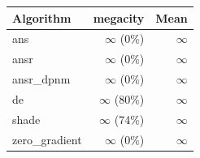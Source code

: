\begin{tabular}{lrr}
\toprule
Algorithm & megacity & Mean \\
\midrule
ans & $\infty$ (0\%) & $\infty$ \\
ansr & $\infty$ (0\%) & $\infty$ \\
ansr\_dpnm & $\infty$ (0\%) & $\infty$ \\
de & $\infty$ (80\%) & $\infty$ \\
shade & $\infty$ (74\%) & $\infty$ \\
zero\_gradient & $\infty$ (0\%) & $\infty$ \\
\bottomrule
\end{tabular}
